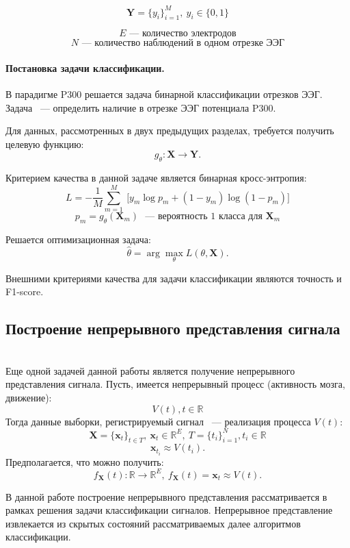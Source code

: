 \documentclass{article}
\newcommand{\x}{\mathbf{x}}
\newcommand{\Y}{\mathbf{Y}}
\newcommand{\X}{\mathbf{X}}
\newcommand{\R}{\mathbb{R}}
\begin{document}
    $$\Y = \{y_i\}_{i=1}^{M},\ y_i \in \{0, 1\}$$
    
    $$E \text{~--- количество электродов}$$
    $$N \text{~--- количество наблюдений в одном отрезке ЭЭГ}$$

    \paragraph{Постановка задачи классификации.}
    
    В парадигме P300 решается задача бинарной классификации отрезков ЭЭГ. Задача ~--- определить наличие в отрезке ЭЭГ потенциала P300.
    
    Для данных, рассмотренных в двух предыдущих разделах, требуется получить целевую функцию:
    $$g_{\theta}: \X \to \Y.$$
    
    Критерием качества в данной задаче является бинарная кросс-энтропия: 
    $$L =  -{\frac {1}{M}}\sum _{m=1}^{M}\ {\bigg [}y_{m}\log {p}_{m}+(1-y_{m})\log(1-{p}_{m}){\bigg ]}$$
    $$p_m = g_{\theta}(\X_m) \text{ ~--- вероятность 1 класса для } \X_m$$

    Решается оптимизационная задача:
    \begin{equation*}
    \hat{\theta} = \arg\max_{\theta} L(\theta, \X).
    \end{equation*}
    
    Внешними критериями качества для задачи классификации являются точность и F1-score.
    
\subsection{Построение непрерывного представления сигнала}\\
    
    Еще одной задачей данной работы является получение непрерывного представления сигнала. 
    Пусть, имеется непрерывный процесс (активность мозга, движение):
    $$V(t), t \in \R$$
    Тогда данные выборки, регистрируемый сигнал ~--- реализация процесса $V(t)$:
    $$\X = \{\x_t\}_{t\in T},\  \x_t \in \R^E,\  T = \{t_i\}_{i=1}^{N}, t_i \in \R$$ 
    $$\x_{t_i} \approx V(t_i).$$
    Предполагается, что можно получить:
    $$f_{\X}(t): \R \to \R^E, \ f_{\X}(t) = \x_t \approx V(t).$$

    В данной работе построение непрерывного представления рассматривается в рамках решения задачи классификации сигналов. Непрерывное представление извлекается из скрытых состояний рассматриваемых далее алгоритмов классификации.
\end{document}
